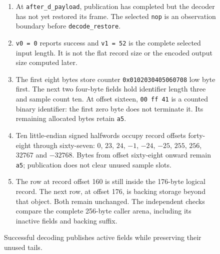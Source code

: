 \begin{figure}[htbp]
\begin{minipage}{\linewidth}
\begin{enumerate}
            \setlength{\parsep}{0pt}
      \item At \texttt{after\_d\_payload}, publication has completed but the decoder has not yet restored its frame. The selected \texttt{nop} is an observation boundary before \texttt{decode\_restore}.
      \item \texttt{v0 = 0} reports success and \texttt{v1 = 52} is the complete selected input length. It is not the flat record size or the encoded output size computed later.
      \item The first eight bytes store counter \texttt{0x0102030405060708} low byte first. The next two four-byte fields hold identifier length three and sample count ten. At offset sixteen, \texttt{00 ff 41} is a counted binary identifier: the first zero byte does not terminate it. Its remaining allocated bytes retain \texttt{a5}.
      \item Ten little-endian signed halfwords occupy record offsets forty-eight through sixty-seven: $0$, $23$, $24$, $-1$, $-24$, $-25$, $255$, $256$, $32767$ and $-32768$. Bytes from offset sixty-eight onward remain \texttt{a5}; publication does not clear unused sample slots.
      \item The row at record offset 160 is still inside the 176-byte logical record. The next row, at offset 176, is backing storage beyond that object. Both remain unchanged. The independent checks compare the complete 256-byte caller arena, including its inactive fields and backing suffix.
    \end{enumerate}
  \end{minipage}
  \caption{Successful decoding publishes active fields while preserving their unused tails.}
  \label{capture:032-cbor-telemetry-published-record}
  \label{cbor-published-record}
\end{figure}
\par
